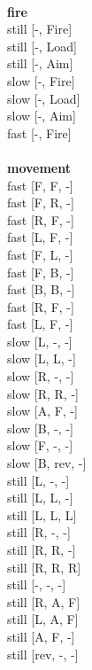 \ \\ {\bf fire } \\
still [-, Fire] \\
still [-, Load] \\
still [-, Aim] \\
slow [-, Fire] \\
slow [-, Load] \\
slow [-, Aim] \\
fast [-, Fire] \\
\ \\ {\bf movement } \\
fast [F, F, -] \\
fast [F, R, -] \\
fast [R, F, -] \\
fast [L, F, -] \\
fast [F, L, -] \\
fast [F, B, -] \\
fast [B, B, -] \\
fast [R, F, -] \\
fast [L, F, -] \\
slow [L, -, -] \\
slow [L, L, -] \\
slow [R, -, -] \\
slow [R, R, -] \\
slow [A, F, -] \\
slow [B, -, -] \\
slow [F, -, -] \\
slow [B, rev, -] \\
still [L, -, -] \\
still [L, L, -] \\
still [L, L, L] \\
still [R, -, -] \\
still [R, R, -] \\
still [R, R, R] \\
still [-, -, -] \\
still [R, A, F] \\
still [L, A, F] \\
still [A, F, -] \\
still [rev, -, -] \\



